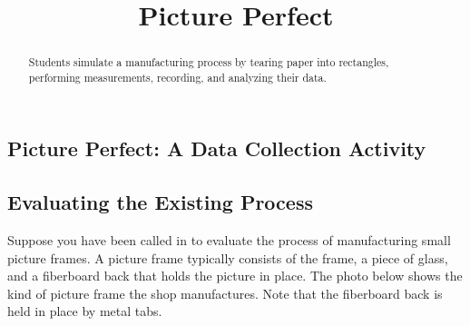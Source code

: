 \documentclass{ximera}
\author{}
\title{Picture Perfect} \license{CC BY-NC-SA 4.0}
\begin{document}
\begin{abstract}
Students simulate a manufacturing process by tearing paper into rectangles, performing measurements, recording, and analyzing their data.
\end{abstract}
\maketitle

\begin{onlineOnly}
\section*{Picture Perfect: A Data Collection Activity}
\end{onlineOnly}

\subsection*{Evaluating the Existing Process}

Suppose you have been called in to evaluate the process of manufacturing small picture frames.  A picture frame typically consists of the frame, a piece of glass, and a fiberboard back that holds the picture in place. The photo below shows the kind of picture frame the shop manufactures. Note that the fiberboard back is held in place by metal tabs.  

\begin{center}
       \end{center}
\end{document}
